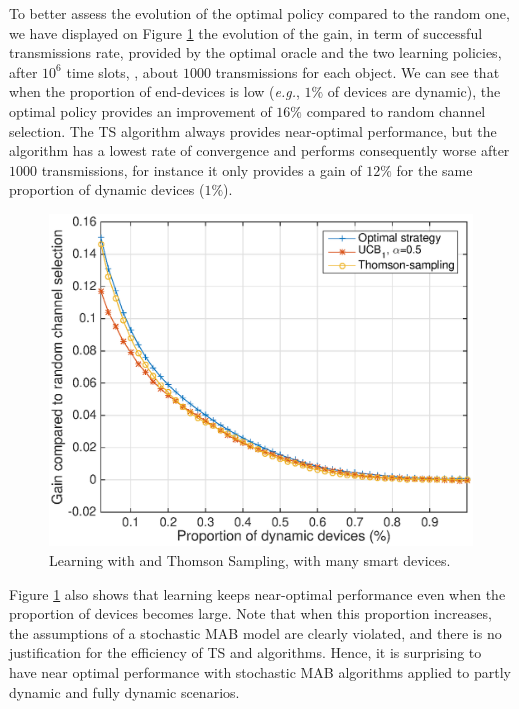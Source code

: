 To better assess the evolution of the optimal policy compared to the random one, we have displayed on Figure \ref{fig:41:perf_learning} the evolution of the gain, in term of successful transmissions rate, provided by the optimal oracle and the two learning policies, after $10^6$ time slots, \ie, about $1000$ transmissions for each object.
We can see that when the proportion of end-devices is low (\emph{e.g.}, $1\%$ of devices are dynamic), the optimal policy provides an improvement of $16\%$ compared to random channel selection.
The TS algorithm always provides near-optimal performance, but the \UCB{} algorithm has a lowest rate of convergence and performs consequently worse after $1000$ transmissions, for instance it only provides a gain of $12\%$ for the same proportion of dynamic devices ($1\%$).

\begin{figure}[!t]
    \centering
    \includegraphics[scale=0.65]{2-Chapters/4-Chapter/CrownCom_17.git/perf_learning.eps}
    \caption{Learning with \UCB{} and Thomson Sampling, with many smart devices.}
    \label{fig:41:perf_learning}
\end{figure}

Figure \ref{fig:41:perf_learning} also shows that learning keeps near-optimal performance even when the proportion of devices becomes large.
Note that when this proportion increases, the assumptions of a stochastic MAB model are clearly violated, and there is no justification for the efficiency of TS and \UCB{} algorithms.
Hence, it is surprising to have near optimal performance with stochastic MAB algorithms applied to partly dynamic and fully dynamic scenarios.


